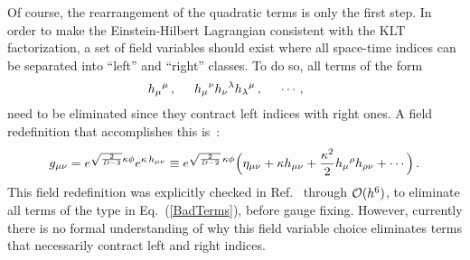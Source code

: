 \documentclass[12pt]{livrev}
\begin{document}
Of course, the rearrangement of the quadratic terms is only the first
step.  In order to make the Einstein-Hilbert Lagrangian consistent
with the KLT factorization, a set of field variables should exist where
all space-time indices can be separated into ``left'' and ``right''
classes. To do so, all terms of the form
%
\begin{equation}
h_{\mu}{}^{\mu}\, , \hskip .5 cm 
h_{\mu}{}^{\nu} h_{\nu}{}^{\lambda} h_{\lambda}{}^{\mu} \,, \hskip .5 cm 
\cdots, \hskip .5 cm
\label{BadTerms}
\end{equation}
%
need to be eliminated since they contract left indices with right
 ones.  A field redefinition that accomplishes this
 is~\cite{BernGrant}:
\begin{equation}
g_{\mu\nu}  = e^{\sqrt{\frac{2}{D-2}} \kappa \phi} e^{\kappa\, h_{\mu\nu}} 
 \equiv 
 e^{\sqrt{\frac{2}{D-2}} \,\kappa \phi} 
\Bigl(\eta_{\mu\nu} + \kappa h_{\mu\nu} + {\textstyle \kappa^2\over 2} 
                    h_{\mu}{}^{\rho} h_{\rho\nu} + \cdots \Bigr) \,. 
\end{equation}
%
This field redefinition was explicitly checked in
Ref.~\cite{BernGrant} through ${\cal O}(h^6)$, to eliminate all terms
of the type in Eq.~(\ref{BadTerms}), before gauge fixing.  However,
currently there is no formal understanding of why this field variable
choice eliminates terms that necessarily contract left and right
indices.
\end{document}
